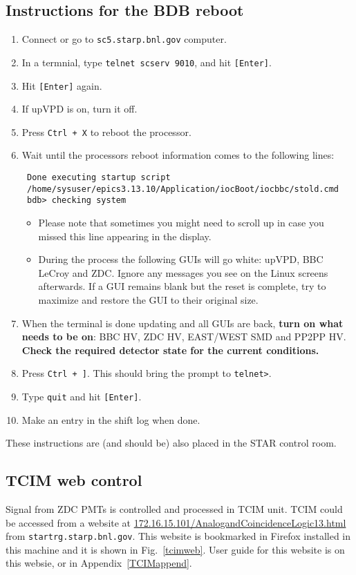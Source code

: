 \subsection{Instructions for the BDB reboot}
\label{bdbreboot}

\begin{enumerate}
\item Connect or go to \texttt{sc5.starp.bnl.gov} computer.
\item In a termnial, type \texttt{telnet scserv 9010}, and hit \texttt{[Enter]}.
\item Hit  \texttt{[Enter]} again.
\item If upVPD is on, turn it off.
\item Press \texttt{Ctrl + X} to reboot the processor.
\item Wait until the processors reboot information comes to the following lines:
\noindent
\begin{verbatim}
 Done executing startup script
 /home/sysuser/epics3.13.10/Application/iocBoot/iocbbc/stold.cmd
 bdb> checking system
\end{verbatim}

\begin{itemize}
 \item Please note that sometimes you might need to scroll up in case you missed this line appearing in the display.
 \item During the process the following GUIs will go white: upVPD, BBC LeCroy and ZDC\@. Ignore any messages you see on the Linux screens afterwards. If a GUI remains blank but the reset is complete, try to maximize and restore the GUI to their original size.
\end{itemize}

\item When the terminal is done updating and all GUIs are back, \textbf{turn on what needs to be on}: BBC HV, ZDC HV, EAST/WEST SMD and PP2PP HV\@. \textbf{Check the required detector state for the current conditions.}
\item Press \texttt{Ctrl + ]}. This should bring the prompt to \texttt{telnet>}.
\item Type \texttt{quit} and hit \texttt{[Enter]}.
\item Make an entry in the shift log when done.
\end{enumerate}

These instructions are (and should be) also placed in the STAR control room.

\subsection{TCIM web control}
Signal from ZDC PMTs is controlled and processed in TCIM unit. TCIM could be accessed from a website at  \url{172.16.15.101/AnalogandCoincidenceLogic13.html} from \texttt{startrg.starp.bnl.gov}. This website is bookmarked in Firefox installed in this machine and it is shown in Fig.~\ref{tcimweb}. User guide for this website is on this websie, or in Appendix~\ref{TCIMappend}.

